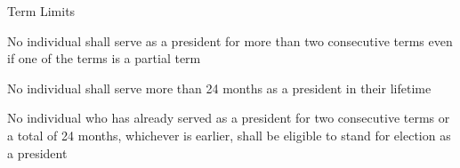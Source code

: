 
     \item{Term Limits}
     \begin{longenum}[label*=\arabic*., align=left]
     \item No individual shall serve as a president for more than two consecutive terms even if one of the terms is a partial term
     \item No individual shall serve more than 24 months as a president in their lifetime
     \item No individual who has already served as a president for two consecutive terms or a total of 24 months, whichever is earlier, shall be eligible to stand for election as a president
      \end{longenum}
